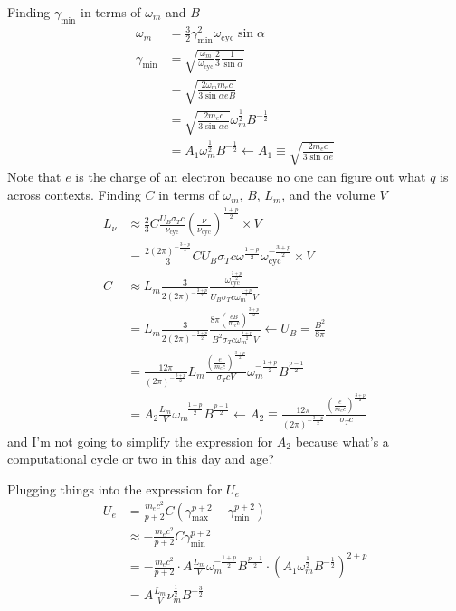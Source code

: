 \begin{enumerate}
{	\begin{multicols}{2}
	    \raggedcolumns
	    Finding $\gamma_\text{min}$ in terms of $\omega_m$ and $B$
	    \begin{align*}
	        \omega_m &= \frac{3}{2}\gamma_\text{min}^2\omega_\text{cyc}\sin\alpha\\
	        \gamma_\text{min} &= \sqrt{\frac{\omega_m}{\omega_\text{cyc}}\frac{2}{3}\frac{1}{\sin\alpha}}\\
	            &= \sqrt{\frac{2\omega_mm_ec}{3\sin\alpha eB}}\\
	            &= \sqrt{\frac{2m_ec}{3\sin\alpha e}}\omega_m^\frac{1}{2}B^{-\frac{1}{2}}\\
	            &= A_1 \omega_m^\frac{1}{2}B^{-\frac{1}{2}} \longleftarrow A_1  \equiv \sqrt{\frac{2m_ec}{3\sin\alpha e}}
	    \end{align*}
	    Note that $e$ is the charge of an electron because no one can figure out what $q$ is across contexts.
	    \vfill\columnbreak
	    Finding $C$ in terms of $\omega_m$, $B$, $L_m$, and the volume $V$
	    \begin{align*}
	        L_\nu &\approx \frac{2}{3}C\frac{U_B\sigma_Tc}{\nu_\text{cyc}}\left(\frac{\nu}{\nu_\text{cyc}}\right)^\frac{1+p}{2}\times V\\
	            &= \frac{2(2\pi)^{-\frac{3+p}{2}}}{3}CU_B\sigma_Tc\omega^\frac{1+p}{2}\omega_\text{cyc}^{-\frac{3+p}{2}}\times V\\
	        C &\approx L_m\frac{3}{2(2\pi)^{-\frac{3+p}{2}}}\frac{\omega_\text{cyc}^\frac{3+p}{2}}{U_B\sigma_Tc\omega_m^\frac{1+p}{2}V}\\
	            &= L_m\frac{3}{2(2\pi)^{-\frac{3+p}{2}}}\frac{8\pi\left(\frac{eB}{m_ec}\right)^\frac{3+p}{2}}{B^2\sigma_Tc\omega_m^\frac{1+p}{2}V} \longleftarrow U_B = \frac{B^2}{8\pi}\\
	            &= \frac{12\pi}{(2\pi)^{-\frac{3+p}{2}}}L_m\frac{\left(\frac{e}{m_ec}\right)^\frac{3+p}{2}}{\sigma_TcV}\omega_m^{-\frac{1+p}{2}}B^\frac{p-1}{2}\\
	            &= A_2\frac{L_m}{V}\omega_m^{-\frac{1+p}{2}}B^{\frac{p-1}{2}} \longleftarrow A_2\equiv \frac{12\pi}{(2\pi)^{-\frac{3+p}{2}}}\frac{\left(\frac{e}{m_ec}\right)^\frac{3+p}{2}}{\sigma_Tc}
	    \end{align*}
	    and I'm not going to simplify the expression for $A_2$ because what's a computational cycle or two in this day and age?
	\end{multicols}
	Plugging things into the expression for $U_e$
	\begin{align*}
		U_e &= \frac{m_ec^2}{p+2}C\left(\gamma_\text{max}^{p+2} - \gamma_\text{min}^{p+2}\right)\\
			&\approx -\frac{m_ec^2}{p+2}C\gamma_\text{min}^{p+2}\\
			&= -\frac{m_ec^2}{p+2}\cdot A\frac{L_m}{V}\omega_m^{-\frac{1+p}{2}}B^{\frac{p-1}{2}} \cdot \left(A_1\omega_m^\frac{1}{2}B^{-\frac{1}{2}}\right)^{2+p}\\
			&= A\frac{L_m}{V}\nu_m^\frac{1}{2}B^{-\frac{3}{2}}
	\end{align*}
}


\end{enumerate}
